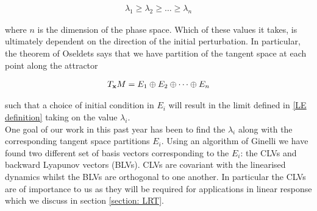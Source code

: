 \begin{align}
    \lambda_1 \geq \lambda_2 \geq \dots \geq \lambda_n \label{LE list}
\end{align}

where $n$ is the dimension of the phase space. Which of these values it takes, is ultimately dependent on the direction of the initial perturbation. In particular, the theorem of Oseldets says that we have partition of the tangent space at each point along the attractor

\begin{align}
T_{\vb{x}} M = E_1 \oplus E_2 \oplus \dots \oplus E_n \label{Ruelle Split}
\end{align}

such that a choice of initial condition in $E_i$ will result in the limit defined in \ref{LE definition} taking on the value $\lambda_i$.\\

One goal of our work in this past year has been to find the $\lambda_i$ along with the corresponding tangent space partitions $E_i$. Using an algorithm of Ginelli \cite{Ginelli2013} we have found two different set of basis vectors corresponding to the $E_i$: the CLVs and backward Lyapunov vectors (BLVs). CLVs are covariant with the linearised dynamics whilst the BLVs are orthogonal to one another. In particular the CLVs are of importance to us as they will be required for applications in linear response which we discuss in section \ref{section: LRT}.
